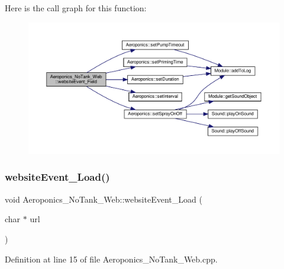 Here is the call graph for this function\+:
\nopagebreak
\begin{figure}[H]
\begin{center}
\leavevmode
\includegraphics[width=350pt]{class_aeroponics___no_tank___web_ad91ef49025ae421e26f39a5df527d95e_cgraph}
\end{center}
\end{figure}
\mbox{\label{class_aeroponics___no_tank___web_a59a1c123bc843197e74c16e8aac7daa2}} 
\subsubsection{\texorpdfstring{website\+Event\+\_\+\+Load()}{websiteEvent\_Load()}}
{\footnotesize\ttfamily void Aeroponics\+\_\+\+No\+Tank\+\_\+\+Web\+::website\+Event\+\_\+\+Load (\begin{DoxyParamCaption}\item[{char $\ast$}]{url }\end{DoxyParamCaption})}



Definition at line 15 of file Aeroponics\+\_\+\+No\+Tank\+\_\+\+Web.\+cpp.

